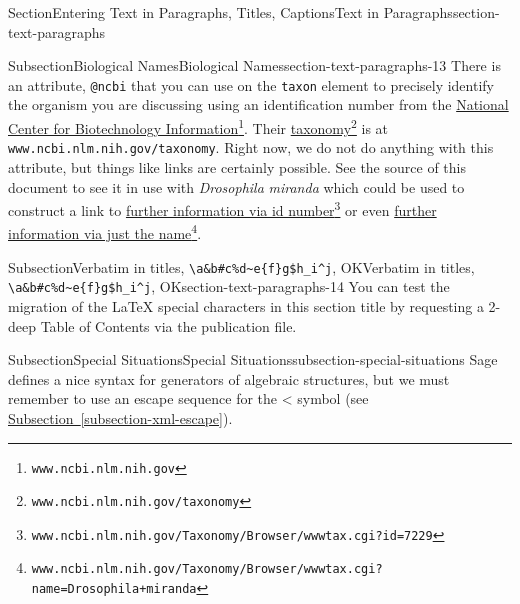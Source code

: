 \documentclass[twoside,10pt,]{article}
\newcommand{\xreffont}{\relax}
\newcommand{\mono}[1]{\texttt{#1}}
\numberwithin{equation}{section}
\begin{document}
\begin{sectionptx}{Section}{Entering Text in Paragraphs, Titles, Captions}{}{Text in Paragraphs}{}{}{section-text-paragraphs}
\begin{subsectionptx}{Subsection}{Biological Names}{}{Biological Names}{}{}{section-text-paragraphs-13}
There is an attribute, \mono{@ncbi} that you can use on the \mono{taxon} element to precisely identify the organism you are discussing using an identification number from the \href{https://www.ncbi.nlm.nih.gov/}{National Center for Biotechnology Information}\footnote{\nolinkurl{www.ncbi.nlm.nih.gov}\label{section-text-paragraphs-13-6-7}}.  Their \href{https://www.ncbi.nlm.nih.gov/taxonomy}{taxonomy}\footnote{\nolinkurl{www.ncbi.nlm.nih.gov/taxonomy}\label{section-text-paragraphs-13-6-9}} is at \mono{www.ncbi.nlm.nih.gov/taxonomy}.  Right now, we do not do anything with this attribute, but things like links are certainly possible.  See the source of this document to see it in use with \textit{Drosophila} \textit{miranda} which could be used to construct a link to \href{https://www.ncbi.nlm.nih.gov/Taxonomy/Browser/wwwtax.cgi?id=7229}{further information via id number}\footnote{\nolinkurl{www.ncbi.nlm.nih.gov/Taxonomy/Browser/wwwtax.cgi?id=7229}\label{section-text-paragraphs-13-6-13}} or even \href{https://www.ncbi.nlm.nih.gov/Taxonomy/Browser/wwwtax.cgi?name=Drosophila+miranda}{further information via just the name}\footnote{\nolinkurl{www.ncbi.nlm.nih.gov/Taxonomy/Browser/wwwtax.cgi?name=Drosophila+miranda}\label{section-text-paragraphs-13-6-15}}.%
\end{subsectionptx}
%
%
\typeout{************************************************}
\typeout{Subsection 9.10 Verbatim in titles, \mono{\textbackslash{}a\&b\#c\%d\textasciitilde{}e\{f\}g\$h\_i\textasciicircum{}j}, OK}
\typeout{************************************************}
%
\begin{subsectionptx}{Subsection}{Verbatim in titles, \mono{\textbackslash{}a\&b\#c\%d\textasciitilde{}e\{f\}g\$h\_i\textasciicircum{}j}, OK}{}{Verbatim in titles, \mono{\textbackslash{}a\&b\#c\%d\textasciitilde{}e\{f\}g\$h\_i\textasciicircum{}j}, OK}{}{}{section-text-paragraphs-14}
You can test the migration of the \LaTeX{} special characters in this section title by requesting a 2-deep Table of Contents via the publication file.%
\end{subsectionptx}
%
%
\typeout{************************************************}
\typeout{************************************************}
%
\begin{subsectionptx}{Subsection}{Special Situations}{}{Special Situations}{}{}{subsection-special-situations}
Sage defines a nice syntax for generators of algebraic structures, but we must remember to use an escape sequence for the \textless{} symbol (see \hyperref[subsection-xml-escape]{Subsection~{\xreffont\ref{subsection-xml-escape}}}).%

\end{subsectionptx}
\end{sectionptx}
\end{document}
